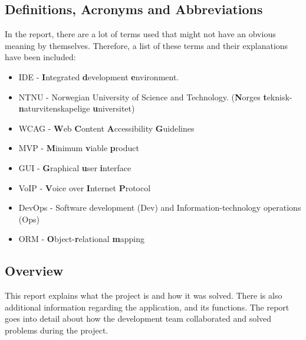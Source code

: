 \subsection{Definitions, Acronyms and Abbreviations}
In the report, there are a lot of terms used that might not have an obvious meaning by themselves. Therefore, a list of these terms and their explanations have been included:
\begin{itemize}
    \item IDE - \textbf{I}ntegrated \textbf{d}evelopment \textbf{e}nvironment.
    \item NTNU - Norwegian University of Science and Technology. (\textbf{N}orges \textbf{t}eknisk-\textbf{n}aturvitenskapelige \textbf{u}niversitet)
    \item WCAG - \textbf{W}eb \textbf{C}ontent \textbf{A}ccessibility \textbf{G}uidelines 
    \item MVP - \textbf{M}inimum \textbf{v}iable \textbf{p}roduct
    \item GUI - \textbf{G}raphical \textbf{u}ser
    \textbf{i}nterface
    \item VoIP - \textbf{V}oice over \textbf{I}nternet \textbf{P}rotocol
    \item DevOps - Software development (Dev) and Information-technology operations (Ops)
    \item ORM - \textbf{O}bject-\textbf{r}elational \textbf{m}apping
\end{itemize}


\subsection{Overview}
This report explains what the project is and how it was solved. There is also additional information regarding the application, and its functions. The report goes into detail about how the development team collaborated and solved problems during the project. 


